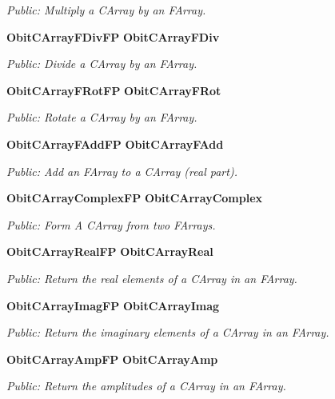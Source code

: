 \begin{CompactItemize}
\begin{CompactList}\small\item\em Public: Multiply a CArray by an FArray. \item\end{CompactList}\item 
{\bf Obit\-CArray\-FDiv\-FP} {\bf Obit\-CArray\-FDiv}
\begin{CompactList}\small\item\em Public: Divide a CArray by an FArray. \item\end{CompactList}\item 
{\bf Obit\-CArray\-FRot\-FP} {\bf Obit\-CArray\-FRot}
\begin{CompactList}\small\item\em Public: Rotate a CArray by an FArray. \item\end{CompactList}\item 
{\bf Obit\-CArray\-FAdd\-FP} {\bf Obit\-CArray\-FAdd}
\begin{CompactList}\small\item\em Public: Add an FArray to a CArray (real part). \item\end{CompactList}\item 
{\bf Obit\-CArray\-Complex\-FP} {\bf Obit\-CArray\-Complex}
\begin{CompactList}\small\item\em Public: Form A CArray from two FArrays. \item\end{CompactList}\item 
{\bf Obit\-CArray\-Real\-FP} {\bf Obit\-CArray\-Real}
\begin{CompactList}\small\item\em Public: Return the real elements of a CArray in an FArray. \item\end{CompactList}\item 
{\bf Obit\-CArray\-Imag\-FP} {\bf Obit\-CArray\-Imag}
\begin{CompactList}\small\item\em Public: Return the imaginary elements of a CArray in an FArray. \item\end{CompactList}\item 
{\bf Obit\-CArray\-Amp\-FP} {\bf Obit\-CArray\-Amp}
\begin{CompactList}\small\item\em Public: Return the amplitudes of a CArray in an FArray. \item\end{CompactList}\item 

\end{CompactItemize}
